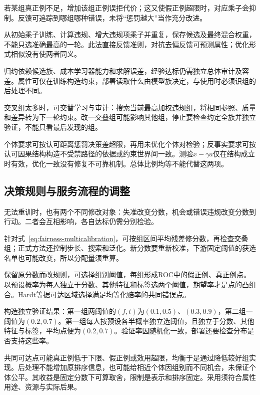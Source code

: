 若某组真正例不足，增加该组正例误拒代价；这又使假正例超限时，对应乘子会抑制。反馈可追踪到哪组哪种错误，未将“惩罚越大”当作充分改进。

从初始乘子训练、计算违规、增大违规项乘子并重复，保存候选及最终混合权重，不能只选准确最高的一轮。此法直接反馈准则，对抗去偏反馈可预测属性；优化形式相似没有使两者同义。

归约依赖候选族、成本学习器能力和求解误差，经验达标仍需独立总体审计及容差。属性可仅在训练构造约束，部署读取什么由模型族决定，与使用时必须识组的后处理不同。

交叉组太多时，可交替学习与审计：搜索当前最高加权违规组，将相同参照、质量和差异转为下一轮约束。改一交叠组可能影响其他组，停止要检查约定全族并独立验证，不能只看最后发现的组。

个体要求可按认可距离惩罚决策差超限，再用未优化个体对检验；反事实要求可按认可因果结构构造不受禁路径的依据或约束世界间一致。测验$x-\gamma a$仅在结构成立时有效，优化一致没有修复不可靠机制。总体比例均等不能代替这两项。

\subsection{决策规则与服务流程的调整}
\label{sec:fairness-decision-intervention}

无法重训时，也有两个不同修改对象：失准改变分数，机会或错误违规改变分数到行动。二者会互相影响，各自达标仍需分别检验。

针对式~\eqref{eq:fairness-multicalibration}，可按组区间平均残差修分数，再检查交叠组；正式方法还控制步长、搜索和泛化。新分数要重新校准，下游固定阈值的获选名单也可能改变，所以分配量须重算。

保留原分数而改规则，可选择组别阈值，每组形成ROC中的假正例、真正例点。以预设概率为每人独立于分数、其他特征和标签选两个阈值，期望率才是点的凸组合。Hardt等据可达区域选择满足均等化赔率的共同错误点。

\begin{example}[随机化如何补出共同错误率]
\label{ex:fairness-random-threshold}
构造独立验证结果：第一组两阈值的$(f,t)$为$(0.1,0.5)$、$(0.3,0.9)$，第二组一阈值为$(0.2,0.7)$。第一组每人按预设各半概率独立选阈值，且独立于分数、其他特征与标签，平均点便为$(0.2,0.7)$。验证率因随机化一致，部署还要检查分布是否支持这些率。
\end{example}

共同可达点可能真正例低于下限、假正例或效用超限，均衡于是通过降低较好组实现。后处理不能增加原排序信息，也可能给相近个体因组别而不同机会，未保证个体公平。其收益是固定分数下可算取舍，限制是表示和排序固定。采用须符合属性用途、资源与实际后果。

